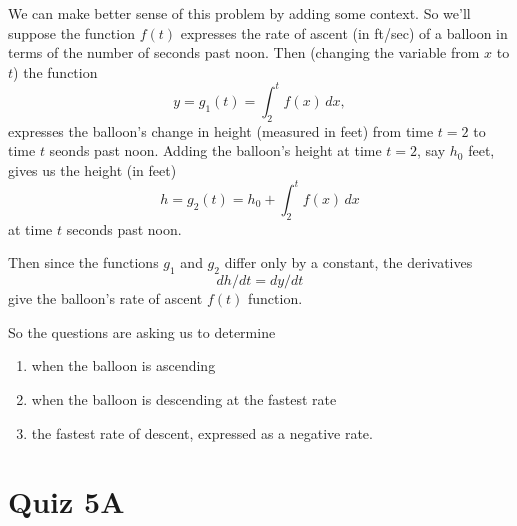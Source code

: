 \documentclass{ximera}
\begin{document}
\begin{question}
\begin{explanation}
We can make better sense of this problem by adding some context. So we'll suppose the function $f(t)$ expresses the rate of ascent (in ft/sec) of a balloon in terms of the number of seconds past noon. Then (changing the variable from $x$ to $t$) the function 
\[
  y = g_1(t) = \int_2^t f(x)\, dx ,
\]
expresses the balloon's change in height (measured in feet) from time $t=2$ to time $t$ seonds past noon. Adding the balloon's height at time $t=2$, say $h_0$ feet, gives us the height (in feet)
\[
 h = g_2(t) = h_0 + \int_2^t f(x)\, dx
\]
at time $t$ seconds past noon.

Then since the functions $g_1$ and $g_2$ differ only by a constant, the derivatives 
\[
dh/dt = dy/dt 
\]
give the balloon's rate of ascent $f(t)$ function. 

So the questions are asking us to determine
\begin{enumerate}
\item when the balloon is ascending

\item when the balloon is descending at the fastest rate

\item the fastest rate of descent, expressed as a negative rate.


\end{enumerate}
\end{explanation}
\end{question}

\section{Quiz 5A}
\end{document}
